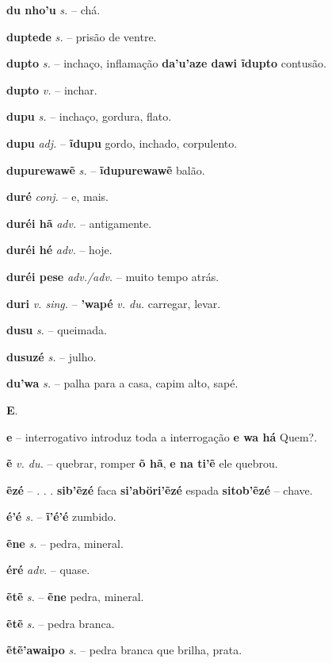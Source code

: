 \textbf{du nho'u} \textit{s.} -- chá.

\textbf{duptede} \textit{s.} -- prisão de ventre.

\textbf{dupto} \textit{s.} -- inchaço, inflamação  \textbf{da'u'aze dawi ĩdupto} contusão.

\textbf{dupto} \textit{v.} -- inchar.

\textbf{dupu} \textit{s.} -- inchaço, gordura, flato.

\textbf{dupu} \textit{adj.} -- \textbf{ĩdupu} gordo, inchado, corpulento.

\textbf{dupurewawẽ} \textit{s.} -- \textbf{ĩdupurewawẽ} balão.

\textbf{duré} \textit{conj.} -- e, mais.

\textbf{duréi hã} \textit{adv.} -- antigamente.

\textbf{duréi hé} \textit{adv.} -- hoje.

\textbf{duréi pese} \textit{adv./adv.} -- muito tempo atrás.

\textbf{duri} \textit{v. sing.} -- \textbf{'wapé} \textit{v. du.} carregar, levar.

\textbf{dusu} \textit{s.} -- queimada.

\textbf{dusuzé} \textit{s.} -- julho.

\textbf{du'wa} \textit{s.} -- palha para a casa, capim alto, sapé.



\textbf{E}.



\textbf{e} -- interrogativo  introduz toda a interrogação  \textbf{e wa há} Quem?.

\textbf{ẽ} \textit{v. du.} -- quebrar, romper  \textbf{õ hã}, \textbf{e na ti'ẽ} ele quebrou.

\textbf{ẽzé} -- . . .  \textbf{sib'ẽzé} faca  \textbf{si'aböri'ẽzé} espada  \textbf{sitob'ẽzé} -- chave.

\textbf{é'é} \textit{s.} -- \textbf{ĩ'é'é} zumbido.

\textbf{ẽne} \textit{s.} -- pedra, mineral.

\textbf{éré} \textit{adv.} -- quase.

\textbf{ẽtẽ} \textit{s.} -- \textbf{ẽne} pedra, mineral.

\textbf{ẽtẽ} \textit{s.} -- pedra branca.

\textbf{ẽtẽ'awaipo} \textit{s.} -- pedra branca que brilha, prata.

